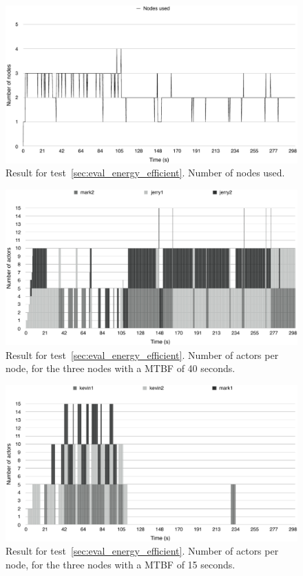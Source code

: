 \documentclass{cslthse-msc}
\begin{document}
\begin{figure}[!hbt]
\centering
\includegraphics[scale=0.5]{images/results/energy_efficient/total.pdf}
\caption{Result for test~\ref{sec:eval_energy_efficient}. Number of nodes used.} \label{fig:eval_energy_efficient_total}
\end{figure}

\begin{figure}[!hbt]
\centering
\includegraphics[scale=0.5]{images/results/energy_efficient/MTBF_40.pdf}
\caption{Result for test~\ref{sec:eval_energy_efficient}. Number of actors per node, for the three nodes with a MTBF of 40 seconds.} \label{fig:eval_energy_efficient_mtbf_40}
\end{figure}

\begin{figure}[!hbt]
\centering
\includegraphics[scale=0.5]{images/results/energy_efficient/MTBF_15.pdf}
\caption{Result for test~\ref{sec:eval_energy_efficient}. Number of actors per node, for the three nodes with a MTBF of 15 seconds.} \label{fig:eval_energy_efficient_mtbf_15}
\end{figure}
\end{document}
